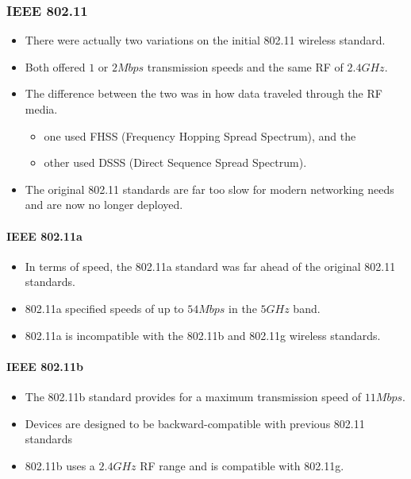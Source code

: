 \subsubsection*{IEEE 802.11}
\begin{itemize}
	\item There were actually two variations on the initial 802.11 wireless standard.
	\item Both offered $ 1 $ or $ 2Mbps $ transmission speeds and the same RF of $ 2.4GHz $.
	\item The difference between the two was in how data traveled through the RF media. 
	\begin{itemize}
		\item one used FHSS (Frequency Hopping Spread Spectrum), and the 
		\item other used DSSS (Direct Sequence Spread Spectrum). 
	\end{itemize}
	\item The original 802.11 standards are far too slow for modern networking needs and are now no longer deployed.
\end{itemize}

\paragraph*{IEEE 802.11a}
\begin{itemize}
	\item In terms of speed, the 802.11a standard was far ahead of the original 802.11 standards. 
	\item 802.11a specified speeds of up to $ 54Mbps $ in the $ 5GHz $ band.
	\item 802.11a is incompatible with the 802.11b and 802.11g wireless standards.
\end{itemize}

\paragraph*{IEEE 802.11b}
\begin{itemize}
	\item The 802.11b standard provides for a maximum transmission speed of $ 11Mbps $. 
	\item Devices are designed to be backward-compatible with previous 802.11 standards
	\item 802.11b uses a $ 2.4GHz $ RF range and is compatible with 802.11g.
\end{itemize}


